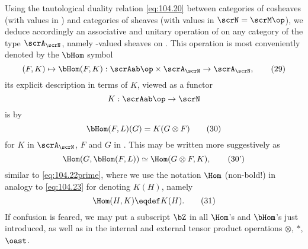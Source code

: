 Using the tautological duality relation \eqref{eq:104.20} between
categories of cosheaves (with values in \scrM) and categories of
sheaves (with values in $\scrN=\scrM\op$), we deduce accordingly an
associative and unitary operation of \scrAab{} on any category of the
type $\scrA_\scrN$, namely \scrN-valued sheaves on \scrA. This
operation is most conveniently denoted by the $\bHom$ symbol
\begin{equation}
  \label{eq:104.29}
  (F,K)\mapsto \bHom(F,K): \scrAab\op\times\scrA_\scrN\to\scrA_\scrN,\tag{29}
\end{equation}
its explicit description in terms of $K$, viewed as a functor
\[K:\scrAab\op\to\scrN\]
is by
\begin{equation}
  \label{eq:104.30}
  \bHom(F,L)(G)=K(G\otimes F)\tag{30}
\end{equation}
for $K$ in $\scrA_\scrN$, $F$ and $G$ in \scrAab. This may be written
more suggestively as
\begin{equation}
  \label{eq:104.30prime}
  \Hom(G, \bHom(F,L)) \simeq \Hom(G\otimes F, K),\tag{30'}
\end{equation}
similar to \eqref{eq:104.22prime}, where we use the notation $\Hom$
(non-bold!) in analogy to \eqref{eq:104.23} for
denoting $K(H)$, namely
\begin{equation}
  \label{eq:104.31}
  \Hom(H,K)\eqdef K(H).\tag{31}
\end{equation}
If confusion is feared, we may put a subscript $\bZ$ in all $\Hom$'s
and $\bHom$'s just introduced, as well as in the internal and external
tensor product operations $\otimes$, $*$, $\oast$.

